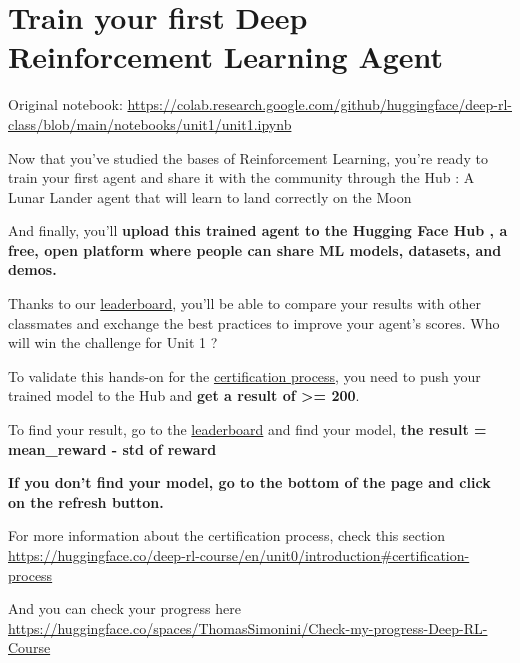 \documentclass[11pt,a4paper]{article}
\begin{document}
\section{Train your first Deep Reinforcement Learning Agent}\label{train-your-first-deep-reinforcement-learning-agent}

Original notebook: \url{https://colab.research.google.com/github/huggingface/deep-rl-class/blob/main/notebooks/unit1/unit1.ipynb}

Now that you've studied the bases of Reinforcement Learning, you're ready to train your first agent and share it with the community through the Hub : A Lunar Lander agent that will learn to land correctly on the Moon


And finally, you'll \textbf{upload this trained agent to the Hugging Face Hub , a free, open platform where people can share ML models, datasets, and demos.}

Thanks to our \href{https://huggingface.co/spaces/huggingface-projects/Deep-Reinforcement-Learning-Leaderboard}{leaderboard}, you'll be able to compare your results with other classmates and exchange the best practices to improve your agent's scores. Who will win the challenge for Unit 1 ?

To validate this hands-on for the \href{https://huggingface.co/deep-rl-course/en/unit0/introduction\#certification-process}{certification process}, you need to push your trained model to the Hub and \textbf{get a result of \textgreater= 200}.

To find your result, go to the \href{https://huggingface.co/spaces/huggingface-projects/Deep-Reinforcement-Learning-Leaderboard}{leaderboard} and find your model, \textbf{the result = mean\_reward - std of reward}

\textbf{If you don't find your model, go to the bottom of the page and click on the refresh button.}

For more information about the certification process, check this section \url{https://huggingface.co/deep-rl-course/en/unit0/introduction\#certification-process}

And you can check your progress here \url{https://huggingface.co/spaces/ThomasSimonini/Check-my-progress-Deep-RL-Course}
\end{document}
